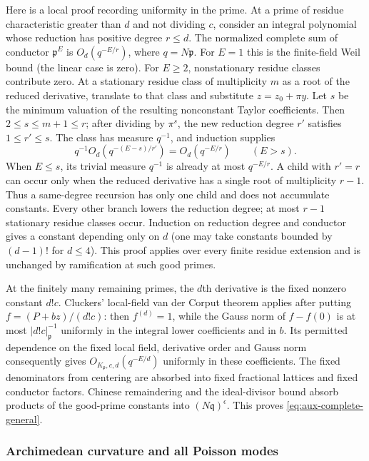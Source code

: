 \documentclass[11pt]{amsart}
\theoremstyle{definition}
\numberwithin{equation}{section}
\begin{document}
Here is a local proof recording uniformity in the prime.  At a prime of
residue characteristic greater than $d$ and not dividing $c$, consider
an integral polynomial whose reduction has positive degree $r\le d$.
The normalized complete sum of conductor $\mathfrak p^E$ is
$O_d(q^{-E/r})$, where $q=N\mathfrak p$.
For $E=1$ this is the finite-field Weil bound (the linear case is zero).
For $E\ge2$, nonstationary residue classes contribute zero.
At a stationary residue class of multiplicity $m$ as a root of the reduced
derivative, translate to that class and substitute $z=z_0+\pi y$.
Let $s$ be the minimum valuation of the resulting nonconstant Taylor
coefficients.  Then $2\le s\le m+1\le r$; after dividing by $\pi^s$,
the new reduction degree $r'$ satisfies $1\le r'\le s$.
The class has measure $q^{-1}$, and induction supplies
\[
 q^{-1}O_d(q^{-(E-s)/r'})=O_d(q^{-E/r})
 \qquad(E>s).
\]
When $E\le s$, its trivial measure $q^{-1}$ is already at most $q^{-E/r}$.
A child with $r'=r$ can occur only when the reduced derivative has a single
root of multiplicity $r-1$.  Thus a same-degree recursion has only one
child and does not accumulate constants.  Every other branch lowers the
reduction degree; at most $r-1$ stationary residue classes occur.
Induction on reduction degree and conductor gives a constant depending
only on $d$ (one may take constants bounded by $(d-1)!$ for $d\le4$).
This proof applies over every finite residue extension and is unchanged
by ramification at such good primes.

At the finitely many remaining primes, the $d$th derivative is the fixed
nonzero constant $d!c$.  Cluckers' local-field van der Corput theorem
\cite[Proposition~3.3]{Cluckers2011} applies after putting
$f=(P+bz)/(d!c)$: then $f^{(d)}=1$, while the Gauss norm of
$f-f(0)$ is at most $|d!c|_\mathfrak p^{-1}$ uniformly in the integral
lower coefficients and in $b$.  Its permitted dependence on the fixed
local field, derivative order and Gauss norm consequently gives
$O_{K_\mathfrak p,c,d}(q^{-E/d})$ uniformly in these coefficients.
The fixed denominators from centering are absorbed into fixed fractional
lattices and fixed conductor factors.  Chinese remaindering and the
ideal-divisor bound absorb
products of the good-prime constants into $(N\mathfrak q)^\epsilon$.
This proves \eqref{eq:aux-complete-general}.

\subsubsection{Archimedean curvature and all Poisson modes}
\end{document}
